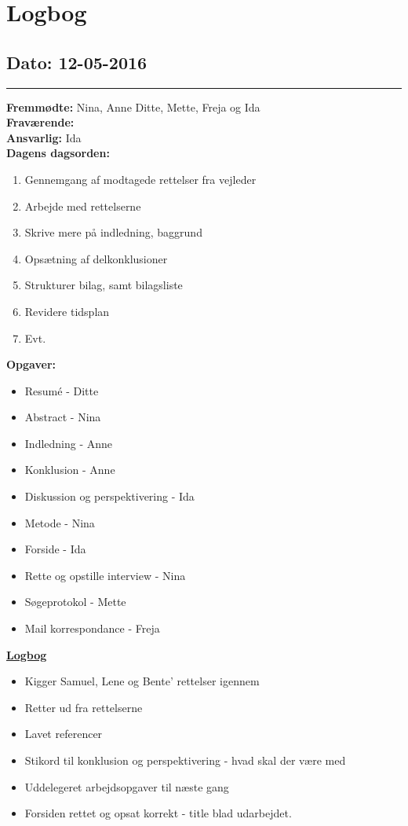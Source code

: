 \chapter{Logbog}
\section{Dato: 12-05-2016}
\hrule
\textbf{Fremmødte: } Nina, Anne Ditte, Mette, Freja og Ida  \\
\textbf{Fraværende: } \\
\textbf{Ansvarlig: } Ida  \\
\textbf{Dagens dagsorden: }
\begin{enumerate}
\item Gennemgang af modtagede rettelser fra vejleder
\item Arbejde med rettelserne
\item Skrive mere på indledning, baggrund
\item Opsætning af delkonklusioner
\item Strukturer bilag, samt bilagsliste
\item Revidere tidsplan
\item Evt. 
\end{enumerate}
\textbf{Opgaver: }
\begin{itemize}
\item Resumé - Ditte
\item Abstract - Nina
\item Indledning - Anne
\item Konklusion - Anne
\item Diskussion og perspektivering - Ida
\item Metode - Nina
\item Forside - Ida
\item Rette og opstille interview - Nina
\item Søgeprotokol - Mette
\item Mail korrespondance - Freja
\end{itemize}
\underline{\textbf{Logbog}}\\
\begin{itemize}
\item Kigger Samuel, Lene og Bente' rettelser igennem
\item Retter ud fra rettelserne
\item Lavet referencer
\item Stikord til konklusion og perspektivering - hvad skal der være med
\item Uddelegeret arbejdsopgaver til næste gang
\item Forsiden rettet og opsat korrekt - title blad udarbejdet.
\end{itemize}